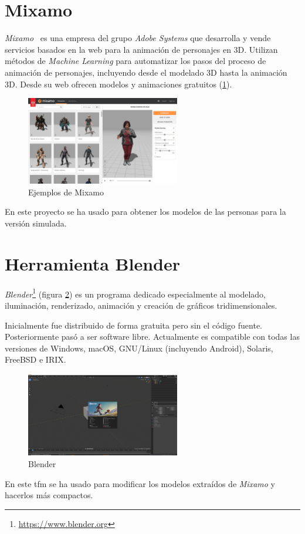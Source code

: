 \section{Mixamo}\label{sec:mixamo}
\textit{Mixamo}~\cite{mixamo} es una empresa del grupo \textit{Adobe Systems} que desarrolla y vende servicios basados en la web para la animación de personajes en 3D. Utilizan métodos de \textit{Machine Learning} para automatizar los pasos del proceso de animación de personajes, incluyendo desde el modelado 3D hasta la animación 3D. Desde su web ofrecen modelos y animaciones gratuitos (\ref{fig.mixamo}).
\begin{figure}[H]
  \begin{center}
    \includegraphics[width=0.6\textwidth]{figures/herramientas/mixamo.png}
		\caption{Ejemplos de Mixamo}
		\label{fig.mixamo}
		\end{center}
\end{figure}
En este proyecto se ha usado para obtener los modelos de las personas para la versión simulada.
\section{Herramienta Blender} \label{sec:blender}
\textit{Blender}\footnote{\url{https://www.blender.org}} (figura \ref{fig:blender}) es un programa dedicado especialmente al modelado, iluminación, renderizado, animación y creación de gráficos tridimensionales.

Inicialmente fue distribuido de forma gratuita pero sin el código fuente. Posteriormente pasó a ser software libre. Actualmente es compatible con todas las versiones de Windows, macOS, GNU/Linux (incluyendo Android), Solaris, FreeBSD e IRIX.
\begin{figure}[H]
  \begin{center}
    \includegraphics[width=0.6\textwidth]{figures/herramientas/blender.png}
		\caption{Blender}
		\label{fig:blender}
		\end{center}
\end{figure}
En este \acrshort{tfm} se ha usado para modificar los modelos extraídos de \textit{Mixamo} y hacerlos más compactos.
